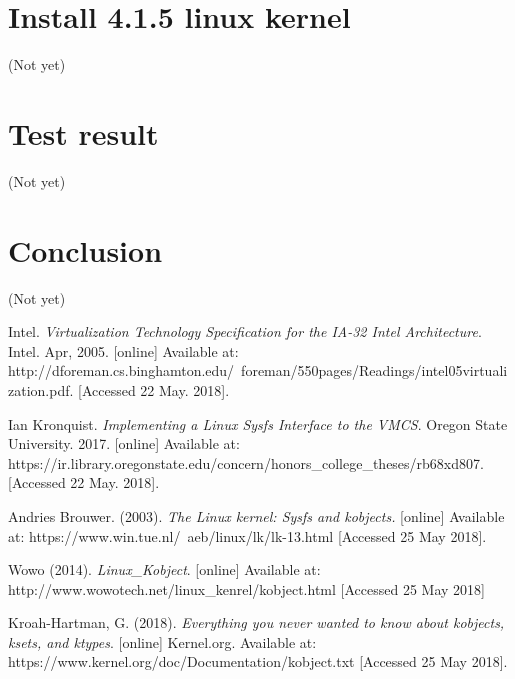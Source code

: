 \documentclass[10pt,draftclsnofoot,journal,compsoc,onecolumn]{IEEEtran}
\begin{document}
\section{Install 4.1.5 linux kernel}
	(Not yet)
\section{Test result}
	(Not yet)
\section{Conclusion}
	(Not yet)
    
\newpage
\begin{thebibliography}{6}

Intel. \textit{Virtualization Technology Specification for the IA-32 Intel Architecture}. Intel. Apr, 2005. [online] Available at:  http://dforeman.cs.binghamton.edu/~foreman/550pages/Readings/intel05virtualization.pdf. [Accessed 22 May. 2018].

Ian Kronquist. \textit{Implementing a Linux Sysfs Interface to the VMCS}. Oregon State University. 2017. [online] Available at: https://ir.library.oregonstate.edu/concern/honors\_college\_theses/rb68xd807. [Accessed 22 May. 2018].

Andries Brouwer. (2003). \textit{The Linux kernel: Sysfs and kobjects.} [online] Available at: https://www.win.tue.nl/~aeb/linux/lk/lk-13.html [Accessed 25 May 2018].

Wowo (2014). \textit{Linux\_Kobject}. [online] Available at: http://www.wowotech.net/linux\_kenrel/kobject.html [Accessed 25 May 2018]

Kroah-Hartman, G. (2018). \textit{Everything you never wanted to know about kobjects, ksets, and ktypes}. [online] Kernel.org. Available at: https://www.kernel.org/doc/Documentation/kobject.txt [Accessed 25 May 2018].
\end{thebibliography}
\end{document}
